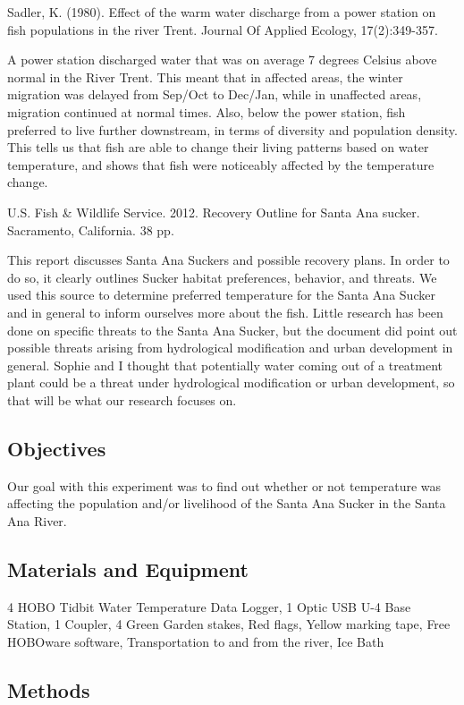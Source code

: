 \documentclass{article}\usepackage[]{graphicx}\usepackage[]{color}
\begin{document}
Sadler, K. (1980). Effect of the warm water discharge from a power station on fish populations in the river Trent. Journal Of Applied Ecology, 17(2):349-357.

A power station discharged water that was on average 7 degrees Celsius above normal in the River Trent. This meant that in affected areas, the winter migration was delayed from Sep/Oct to Dec/Jan, while in unaffected areas, migration continued at normal times. Also, below the power station, fish preferred to live further downstream, in terms of diversity and population density. This tells us that fish are able to change their living patterns based on water temperature, and shows that fish were noticeably affected by the temperature change. 

U.S. Fish \& Wildlife Service. 2012. Recovery Outline for Santa Ana sucker. Sacramento, California. 38 pp.

This report discusses Santa Ana Suckers and possible recovery plans. In order to do so, it clearly outlines Sucker habitat preferences, behavior, and threats. We used this source to determine preferred temperature for the Santa Ana Sucker and in general to inform ourselves more about the fish. Little research has been done on specific threats to the Santa Ana Sucker, but the document did point out possible threats arising from hydrological modification and urban development in general. Sophie and I thought that potentially water coming out of a treatment plant could be a threat under hydrological modification or urban development, so that will be what our research focuses on.

\subsection{Objectives}
Our goal with this experiment was to find out whether or not temperature was affecting the population and/or livelihood of the Santa Ana Sucker in the Santa Ana River.

\subsection{Materials and Equipment}

4 HOBO Tidbit Water Temperature Data Logger,
1 Optic USB U-4 Base Station,
1 Coupler,
4 Green Garden stakes,
Red flags,
Yellow marking tape,
Free HOBOware software,
Transportation to and from the river,
Ice Bath

\subsection{Methods}
\end{document}
